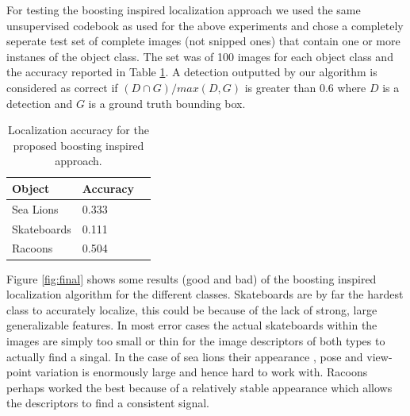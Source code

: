 \documentclass[10pt,twocolumn,letterpaper]{article}
\begin{document}
For testing the boosting inspired localization approach we used the same unsupervised codebook as used
for the above experiments and chose a completely seperate test set of complete images (not snipped ones)
that contain one or more instanes of the object class. The set was of 100 images for each object
class and the accuracy reported in Table \ref{tab:local}. A detection outputted by our algorithm is considered
as correct if \begin{math} (D \cap G) / max( D ,G ) \end{math} is greater than \begin{math}0.6\end{math}
where \begin{math}D\end{math} is a detection and \begin{math}G\end{math} is a ground truth bounding box.
 
 \begin{table}
   \begin{center}
    \begin{tabular}{ | l | l | l | }
    \hline
    \textbf{Object} & \textbf{Accuracy}  \\ \hline
    Sea Lions & 0.333 \\ \hline
    Skateboards & 0.111  \\ \hline
    Racoons & 0.504  \\ \hline
    \end{tabular}
    \caption{Localization accuracy for the proposed boosting inspired approach.}
    \label{tab:local}
    \end{center}
  \end{table}

Figure \ref{fig:final} shows some results (good and bad) of the boosting inspired localization algorithm for the
different classes. Skateboards are by far the hardest class to accurately localize, this could be because
of the lack of strong, large generalizable features. In most error cases the actual skateboards within the images are
simply too small or thin
for the image descriptors of both types to actually find a singal. In the case of sea lions their appearance
, pose and view-point variation is enormously large and hence hard to work with. Racoons perhaps worked the best
because of a relatively stable appearance which allows the descriptors to find a consistent signal.
\end{document}
